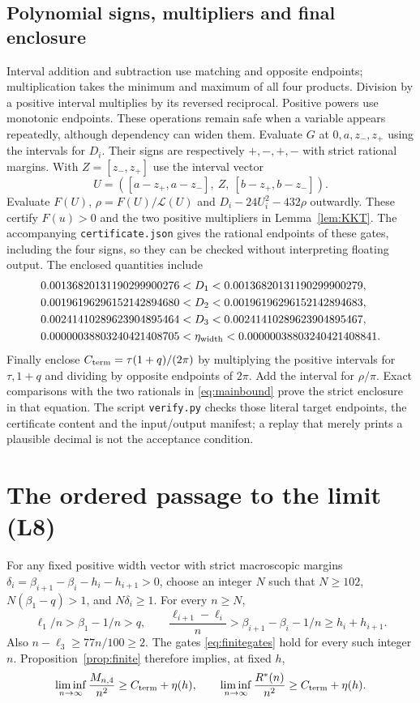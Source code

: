 \documentclass[review,supplement,hidelinks,onefignum,onetabnum]{siamart251216}
\newcommand{\Rstar}{R^*}
\newcommand{\Cterm}{C_{\rm term}}
\newcommand{\etaw}{\eta_{\rm width}}
\begin{document}
\subsection{Polynomial signs, multipliers and final enclosure}
Interval addition and subtraction use matching and opposite endpoints;
multiplication takes the minimum and maximum of all four products.
Division by a positive interval multiplies by its reversed reciprocal.
Positive powers use monotonic endpoints. These operations remain safe
when a variable appears repeatedly, although dependency can widen them.
Evaluate $G$ at $0,a,z_-,z_+$ using the intervals for $D_i$.
Their signs are respectively $+,-,+,-$ with strict rational margins.
With $Z=[z_-,z_+]$ use the interval vector
\[
U=([a-z_+,a-z_-],\ Z,\ [b-z_+,b-z_-]).
\]
Evaluate $F(U)$, $\rho=F(U)/\mathcal L(U)$ and
$D_i-24U_i^2-432\rho$ outwardly. These certify $F(u)>0$ and the
two positive multipliers in Lemma~\ref{lem:KKT}. The accompanying
\texttt{certificate.json} gives the rational endpoints of these gates,
including the four signs, so they can be checked without interpreting
floating output. The enclosed quantities include
\begin{align*}
0.00136820131190299900276&<D_1<0.00136820131190299900279,\\
0.00196196296152142894680&<D_2<0.00196196296152142894683,\\
0.00241410289623904895464&<D_3<0.00241410289623904895467,\\
0.00000038803240421408705&<\etaw<0.00000038803240421408841.
\end{align*}
Finally enclose $\Cterm=\tau(1+q)/(2\pi)$ by multiplying the positive
intervals for $\tau,1+q$ and dividing by opposite endpoints of $2\pi$.
Add the interval for $\rho/\pi$. Exact comparisons with the two rationals
in \eqref{eq:mainbound} prove the strict enclosure in that equation.
The script \texttt{verify.py} checks those literal target endpoints, the
certificate content and the input/output manifest; a replay that merely
prints a plausible decimal is not the acceptance condition.

\section{The ordered passage to the limit (L8)}\label{sec:limit}
For any fixed positive width vector with strict macroscopic margins
$\delta_i=\beta_{i+1}-\beta_i-h_i-h_{i+1}>0$, choose an integer $N$
such that $N\ge102$, $N(\beta_1-q)>1$, and $N\delta_i\ge1$.
For every $n\ge N$,
\[
\ell_1/n>\beta_1-1/n>q,\qquad
\frac{\ell_{i+1}-\ell_i}{n}>
\beta_{i+1}-\beta_i-1/n\ge h_i+h_{i+1}.
\]
Also $n-\ell_3\ge77n/100\ge2$. The gates \eqref{eq:finitegates}
hold for every such integer $n$. Proposition~\ref{prop:finite} therefore
implies, at fixed $h$,
\begin{equation}\label{eq:fixedlimit}
\liminf_{n\to\infty}\frac{M_{n,4}}{n^2}\ge\Cterm+\eta(h),\qquad
\liminf_{n\to\infty}\frac{\Rstar(n)}{n^2}\ge\Cterm+\eta(h).
\end{equation}
\end{document}
